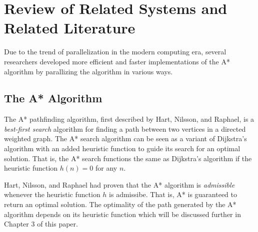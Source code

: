 \chapter{Review of Related Systems and Related Literature}

Due to the trend of parallelization in the modern computing era, \cite{Rios2011,WeinstockHolladay,ZaghloulAlJami2017,Sanz2016}
several researchers developed more efficient and faster implementations 
of the A* algorithm by parallizing the algorithm in various ways.

\section{The A* Algorithm}
The A* pathfinding algorithm, first described by Hart, Nilsson, and Raphael, is a \emph{best-first search} algorithm 
for finding a path between two vertices in a directed weighted graph.\cite{HartNilssonRaphael1968}
The A* search algorithm can be seen as a variant of Dijkstra's algorithm with an added heuristic function to guide its search 
for an optimal solution. That is, the A* search functions the same as Dijkstra's algorithm if the heuristic function $h(n)=0$
for any $n$.\cite{Ferguson2005} 

Hart, Nilsson, and Raphael had proven that the A* algorithm is \emph{admissible} whenever the heuristic
function $h$ is admissibe. That is, A* is guaranteed to return an optimal solution.
The optimality of the path generated by the A* algorithm depends on its heuristic function which will be discussed further in 
Chapter 3 of this paper. 

        
